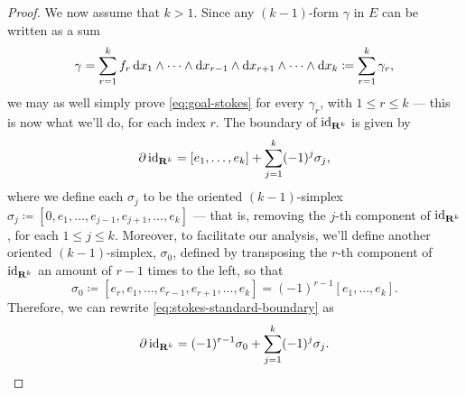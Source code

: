 \begin{proof}
We now assume that \(k > 1\). Since any \((k-1)\)-form \(\gamma\) in \(E\) can
be written as a sum
\[
  \gamma =
  \sum_{r=1}^k f_r\, \mathrm{d} x_1 \wedge \dots \wedge \mathrm{d} x_{r-1} \wedge
    \mathrm{d} x_{r+1} \wedge \dots \wedge \mathrm{d} x_k
  \coloneq \sum_{r=1}^k \gamma_r,
\]
we may as well simply prove \cref{eq:goal-stokes} for every \(\gamma_r\), with
\(1 \leq r \leq k\) --- this is now what we'll do, for each index \(r\). The
boundary of \(\operatorname{id}_{\mathbf{R}^k}\) is given by
\begin{equation}
\label{eq:stokes-standard-boundary}
  \partial \operatorname{id}_{\mathbf{R}^k} = [e_1, \dots, e_k] + \sum_{j=1}^k (-1)^j \sigma_j,
\end{equation}
where we define each \(\sigma_j\) to be the oriented \((k-1)\)-simplex
\(\sigma_j \coloneq [0, e_1, \dots, e_{j-1}, e_{j+1}, \dots, e_k]\) --- that is,
removing the \(j\)-th component of \(\operatorname{id}_{\mathbf{R}^k}\), for each \(1 \leq j \leq
k\). Moreover, to facilitate our analysis, we'll define another oriented
\((k-1)\)-simplex, \(\sigma_0\), defined by transposing the \(r\)-th component of
\(\operatorname{id}_{\mathbf{R}^k}\) an amount of \(r-1\) times to the left, so that
\[
  \sigma_0 \coloneq [e_r, e_1, \dots, e_{r-1}, e_{r+1}, \dots, e_k]
  = (-1)^{r-1} [e_1, \dots, e_k].
\]
Therefore, we can rewrite \cref{eq:stokes-standard-boundary} as
\[
  \partial \operatorname{id}_{\mathbf{R}^k}
  = (-1)^{r-1} \sigma_0 + \sum_{j=1}^k (-1)^{j} \sigma_j.
\]


\end{proof}

